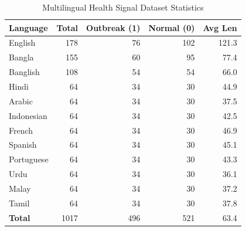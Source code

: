 \begin{table}[h]
\centering
\caption{Multilingual Health Signal Dataset Statistics}
\label{tab:dataset}
\begin{tabular}{lrrrr}
\hline
Language & Total & Outbreak (1) & Normal (0) & Avg Len \\
\hline
English & 178 & 76 & 102 & 121.3 \\
Bangla & 155 & 60 & 95 & 77.4 \\
Banglish & 108 & 54 & 54 & 66.0 \\
Hindi & 64 & 34 & 30 & 44.9 \\
Arabic & 64 & 34 & 30 & 37.5 \\
Indonesian & 64 & 34 & 30 & 42.5 \\
French & 64 & 34 & 30 & 46.9 \\
Spanish & 64 & 34 & 30 & 45.1 \\
Portuguese & 64 & 34 & 30 & 43.3 \\
Urdu & 64 & 34 & 30 & 36.1 \\
Malay & 64 & 34 & 30 & 37.2 \\
Tamil & 64 & 34 & 30 & 37.8 \\
\hline
\textbf{Total} & 1017 & 496 & 521 & 63.4 \\
\hline
\end{tabular}
\end{table}